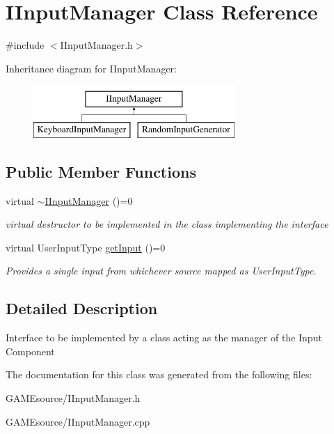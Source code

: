 \hypertarget{class_i_input_manager}{}\section{I\+Input\+Manager Class Reference}
\label{class_i_input_manager}


{\ttfamily \#include $<$I\+Input\+Manager.\+h$>$}

Inheritance diagram for I\+Input\+Manager\+:\begin{figure}[H]
\begin{center}
\leavevmode
\includegraphics[height=2.000000cm]{class_i_input_manager}
\end{center}
\end{figure}
\subsection*{Public Member Functions}
\begin{DoxyCompactItemize}
\item 
\mbox{\label{class_i_input_manager_aa81a10b1ddf305df10c4aebe6930ac86}} 
virtual \mbox{\hyperlink{class_i_input_manager_aa81a10b1ddf305df10c4aebe6930ac86}{$\sim$\+I\+Input\+Manager}} ()=0
\begin{DoxyCompactList}\small\item\em virtual destructor to be implemented in the class implementing the interface \end{DoxyCompactList}\item 
\mbox{\label{class_i_input_manager_afa367fc9694f45150aeb59039dcd4421}} 
virtual User\+Input\+Type \mbox{\hyperlink{class_i_input_manager_afa367fc9694f45150aeb59039dcd4421}{get\+Input}} ()=0
\begin{DoxyCompactList}\small\item\em Provides a single input from whichever source mapped as User\+Input\+Type. \end{DoxyCompactList}\end{DoxyCompactItemize}


\subsection{Detailed Description}
Interface to be implemented by a class acting as the manager of the Input Component 

The documentation for this class was generated from the following files\+:\begin{DoxyCompactItemize}
\item 
G\+A\+M\+Esource/I\+Input\+Manager.\+h\item 
G\+A\+M\+Esource/I\+Input\+Manager.\+cpp\end{DoxyCompactItemize}
